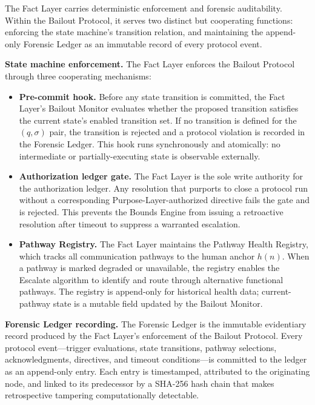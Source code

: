 The Fact Layer carries deterministic enforcement and forensic auditability.  Within
the Bailout Protocol, it serves two distinct but cooperating functions:
enforcing the state machine's transition relation, and maintaining the append-only
Forensic Ledger as an immutable record of every protocol event.

\medskip\noindent
\textbf{State machine enforcement.}  The Fact Layer enforces the Bailout Protocol
through three cooperating mechanisms:

\begin{itemize}\itemsep=0pt
\item[(\textit{i})] \textbf{Pre-commit hook.}  Before any state transition is
committed, the Fact Layer's Bailout Monitor evaluates whether the proposed
transition satisfies the current state's enabled transition set.  If no
transition is defined for the $(q, \sigma)$ pair, the transition is rejected and a
protocol violation is recorded in the Forensic Ledger.  This hook runs
synchronously and atomically: no intermediate or partially-executing state is
observable externally.

\item[(\textit{ii})] \textbf{Authorization ledger gate.}  The Fact Layer is the
sole write authority for the authorization ledger.  Any resolution that purports
to close a protocol run without a corresponding Purpose-Layer-authorized
directive fails the gate and is rejected.  This prevents the Bounds Engine from
issuing a retroactive resolution after timeout to suppress a warranted escalation.

\item[(\textit{iii})] \textbf{Pathway Registry.}  The Fact Layer maintains the
Pathway Health Registry, which tracks all communication pathways to the human
anchor $h(n)$.  When a pathway is marked degraded or unavailable, the registry
enables the Escalate algorithm to identify and route through alternative
functional pathways.  The registry is append-only for historical health data;
current-pathway state is a mutable field updated by the Bailout Monitor.
\end{itemize}

\medskip\noindent
\textbf{Forensic Ledger recording.}  The Forensic Ledger is the immutable
evidentiary record produced by the Fact Layer's enforcement of the Bailout
Protocol.  Every protocol event---trigger evaluations, state transitions,
pathway selections, acknowledgments, directives, and timeout conditions---is
committed to the ledger as an append-only entry.  Each entry is timestamped,
attributed to the originating node, and linked to its predecessor by a SHA-256
hash chain that makes retrospective tampering computationally detectable.

